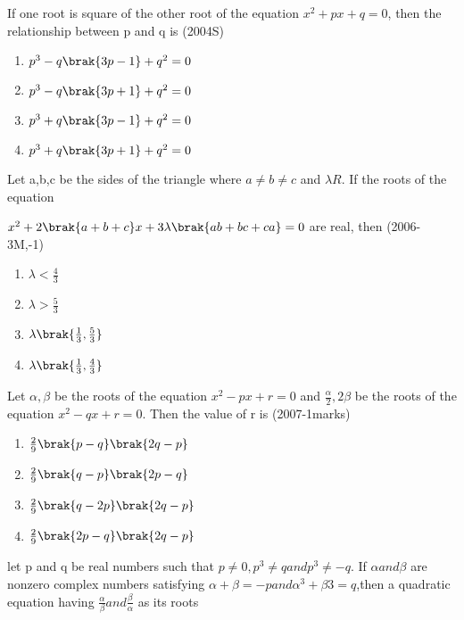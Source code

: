 \iffalse
  \title{Assignment}
  \author{AI24BRECH11025 PEDAPROLU LAKSHMI KUSHAL}
  \section{mcq-single}
\fi

    \item If one root is square of the other root of the equation $x^{2}+px+q=0$, then the relationship between p and q is \hfill (2004S)

\begin{enumerate}
    \item $p^{3}-q\brak{3p-1}+q^{2}=0$
    \item $p^{3}-q\brak{3p+1}+q^{2}=0$
    \item $p^{3}+q\brak{3p-1}+q^{2}=0$
    \item $p^{3}+q\brak{3p+1}+q^{2}=0$
\end{enumerate}
\item Let a,b,c be the sides of the triangle where $a\neq b\neq c$ and $\lambda  R$. If the roots of the equation 

$x^{2}+2\brak{a+b+c}x+3\lambda\brak{ab+bc+ca}=0$ are real, then \hfill(2006-3M,-1)
\begin{multicols}{2}
    \begin{enumerate}
        \item $\lambda<\frac{4}{3}$
        \item $\lambda>\frac{5}{3}$
        \item $\lambda \brak{\frac{1}{3},\frac{5}{3}}$
        \item $\lambda \brak{\frac{1}{3},\frac{4}{3}}$
    \end{enumerate}
\end{multicols}
\item Let $\alpha,\beta$ be the roots of the equation $x^{2}-px+r=0$ and $\frac{\alpha}{2},2\beta$ be the roots of the equation $x^{2}-qx+r=0$. Then the value of r is \hfill (2007-1marks)

\begin{enumerate}
    \item $\frac{2}{9}\brak{p-q}\brak{2q-p}$
    \item $\frac{2}{9}\brak{q-p}\brak{2p-q}$
    \item $\frac{2}{9}\brak{q-2p}\brak{2q-p}$
    \item $\frac{2}{9}\brak{2p-q}\brak{2q-p}$
\end{enumerate}
\item let p and q be real numbers such that $p\neq 0,p^{3}\neq q and p^{3}\neq -q.$ If $\alpha and \beta$ are nonzero complex numbers satisfying $\alpha+\beta=-p and \alpha^{3}+\beta{3}=q$,then a quadratic equation having $\frac{\alpha}{\beta} and \frac{\beta}{\alpha}$ as its roots 

